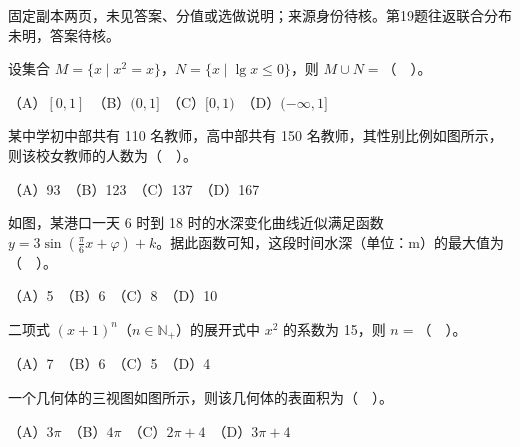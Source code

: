 

\begin{gktip}
固定副本两页，未见答案、分值或选做说明；来源身份待核。第19题往返联合分布未明，答案待核。
\end{gktip}


\begin{question}

设集合 $M=\{x\mid x^2=x\}$，$N=\{x\mid\lg x\leq0\}$，则 $M\cup N=$（　）。

   （A）$[0,1]$　（B）$(0,1]$　（C）$[0,1)$　（D）$(-\infty,1]$

\Needspace{0.4\textheight}
\end{question}
\begin{question}

某中学初中部共有 110 名教师，高中部共有 150 名教师，其性别比例如图所示，则该校女教师的人数为（　）。
\nopagebreak[4]
\begin{center}\end{center}
\nopagebreak[4]
   （A）93　（B）123　（C）137　（D）167

\Needspace{0.4\textheight}
\end{question}
\begin{question}

如图，某港口一天 6 时到 18 时的水深变化曲线近似满足函数 $y=3\sin(\frac\pi6x+\varphi)+k$。据此函数可知，这段时间水深（单位：m）的最大值为（　）。
\nopagebreak[4]
\begin{center}\end{center}
\nopagebreak[4]
   （A）5　（B）6　（C）8　（D）10

\end{question}
\begin{question}

二项式 $(x+1)^n$（$n\in\mathbb N_+$）的展开式中 $x^2$ 的系数为 15，则 $n=$（　）。

   （A）7　（B）6　（C）5　（D）4

\Needspace{0.4\textheight}
\end{question}
\begin{question}

一个几何体的三视图如图所示，则该几何体的表面积为（　）。
\nopagebreak[4]
\begin{center}\end{center}
\nopagebreak[4]
   （A）$3\pi$　（B）$4\pi$　（C）$2\pi+4$　（D）$3\pi+4$

\end{question}
